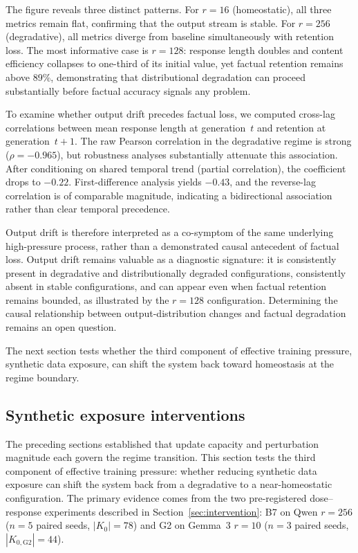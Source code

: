 \documentclass[a4paper,fleqn]{cas-dc}
\begin{document}
The figure reveals three distinct patterns. For $r=16$ (homeostatic), all three
metrics remain flat, confirming that the output stream is stable. For $r=256$
(degradative), all metrics diverge from baseline simultaneously with retention
loss. The most informative case is $r=128$: response length doubles and content
efficiency collapses to one-third of its initial value, yet factual retention
remains above 89\%, demonstrating that distributional degradation can proceed
substantially before factual accuracy signals any problem.

To examine whether output drift precedes factual loss, we computed cross-lag
correlations between mean response length at generation~$t$ and retention at
generation~$t{+}1$. The raw Pearson correlation in the degradative regime is
strong ($\rho = -0.965$), but robustness analyses substantially attenuate this
association. After conditioning on shared temporal trend (partial correlation),
the coefficient drops to $-0.22$. First-difference analysis yields $-0.43$, and
the reverse-lag correlation is of comparable magnitude, indicating a
bidirectional association rather than clear temporal precedence.

Output drift is therefore interpreted as a co-symptom of the same underlying
high-pressure process, rather than a demonstrated causal antecedent of factual
loss. Output drift remains valuable as a diagnostic signature: it is
consistently present in degradative and distributionally degraded configurations,
consistently absent in stable configurations, and can appear even when factual
retention remains bounded, as illustrated by the $r=128$ configuration.
Determining the causal relationship between output-distribution changes and
factual degradation remains an open question.

The next section tests whether the third component of effective training
pressure, synthetic data exposure, can shift the system back toward homeostasis
at the regime boundary.

\subsection{Synthetic exposure interventions}\label{sec:res_intervention}

The preceding sections established that update capacity and perturbation
magnitude each govern the regime transition. This section tests the third
component of effective training pressure: whether reducing synthetic data
exposure can shift the system back from a degradative to a near-homeostatic
configuration. The primary evidence comes from the two pre-registered
dose--response experiments described in Section~\ref{sec:intervention}:
B7 on Qwen $r=256$ ($n=5$ paired seeds, $\lvert K_0\rvert=78$) and G2 on Gemma~3 $r=10$
($n=3$ paired seeds, $|K_{0,\mathrm{G2}}|=44$).
\end{document}
